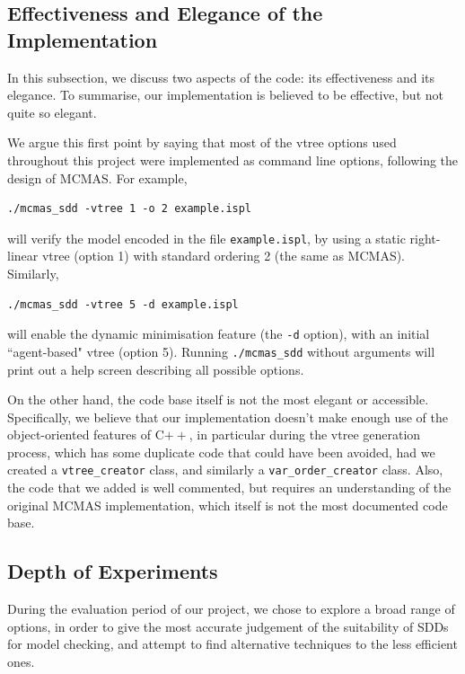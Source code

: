 \documentclass[11pt]{report}
\begin{document}
\subsection{Effectiveness and Elegance of the Implementation}

In this subsection, we discuss two aspects of the code: its effectiveness and its elegance. To summarise, our implementation is believed to be effective, but not quite so elegant. 

We argue this first point by saying that most of the vtree options used throughout this project were implemented as command line options, following the design of MCMAS. For example, 
\begin{verbatim}
./mcmas_sdd -vtree 1 -o 2 example.ispl
\end{verbatim}
will verify the model encoded in the file \texttt{example.ispl}, by using a static right-linear vtree (option 1) with standard ordering 2 (the same as MCMAS). Similarly, 
\begin{verbatim}
./mcmas_sdd -vtree 5 -d example.ispl
\end{verbatim}
will enable the dynamic minimisation feature (the \texttt{-d} option), with an initial ``agent-based" vtree (option 5).
Running \texttt{./mcmas\_sdd} without arguments will print out a help screen describing all possible options. 

On the other hand, the code base itself is not the most elegant or accessible. 
Specifically, we believe that our implementation doesn't make enough use of the object-oriented features of C$++$, in particular during the vtree generation process, which has some duplicate code that could have been avoided, had we created a \texttt{vtree\_creator} class, and similarly a \texttt{var\_order\_creator} class.
Also, the code that we added is well commented, but requires an understanding of the original MCMAS implementation, which itself is not the most documented code base. 




\subsection{Depth of Experiments}

During the evaluation period of our project, we chose to explore a broad range of options, in order to give the most accurate judgement of the suitability of SDDs for model checking, and attempt to find alternative techniques to the less efficient ones. 
\end{document}
